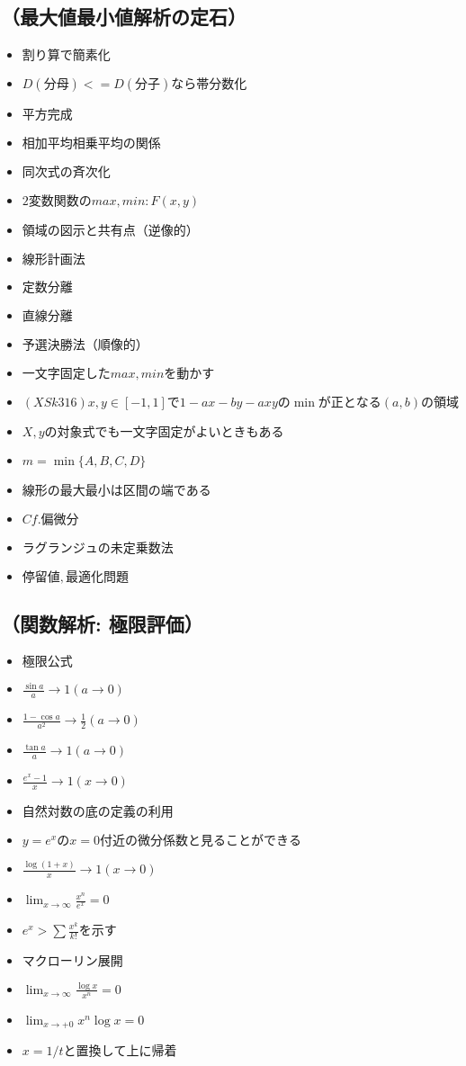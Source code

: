 \documentclass[dvipdfmx,uplatex]{jsarticle}
\begin{document}
\subsection{（最大値最小値解析の定石）}
\begin{itemize}
	\item $ 割り算で簡素化$
		\item $ D(分母) <= D(分子) なら帯分数化$
	\item $ 平方完成$
	\item $ 相加平均相乗平均の関係$
	\item $ 同次式の斉次化$
	\item $ 2変数関数のmax,min: F(x,y)$
		\item $ 領域の図示と共有点（逆像的）$
			\item $ 線形計画法$
			\item $ 定数分離$
			\item $ 直線分離$
		\item $ 予選決勝法（順像的）$
			\item $ 一文字固定したmax,minを動かす$
				\item $ (XSk316) x,y \in [-1,1]で 1-ax-by-axy の \min が正となる(a,b)の領域$
				\item $ X,yの対象式でも一文字固定がよいときもある$
				\item $ m = \min\{A, B, C, D\}$
				\item $ 線形の最大最小は区間の端である$
			\item $ Cf. 偏微分$
				\item $ ラグランジュの未定乗数法$
					\item $ 停留値,最適化問題$
\end{itemize}
\subsection{（関数解析: 極限評価）}
\begin{itemize}
	\item $ 極限公式$
		\item $ \frac{\sin a}{a} \to 1 (a \to 0)$
		\item $ \frac{1 - \cos a}{a^2} \to \frac{1}{2} (a \to 0)$
		\item $ \frac{\tan a}{a} \to 1(a \to 0)$
		\item $ \frac{e^x -1}{x} \to 1 (x \to 0)$
			\item $ 自然対数の底の定義の利用$
			\item $ y = e^x の x=0 付近の微分係数と見ることができる$
		\item $ \frac{\log (1 + x)}{x} \to 1 (x \to 0)$
		\item $ \lim_{x \to \infty} \frac{x^n}{e^x} = 0$
			\item $ e^x > \sum \frac{x^k}{k!} を示す$
				\item $ マクローリン展開$
		\item $ \lim_{x \to \infty} \frac{\log x}{x^n} =0$
		\item $ \lim_{x \to +0} x^n \log x = 0$
			\item $ x = 1/t と置換して上に帰着$
\end{itemize}
\end{document}

